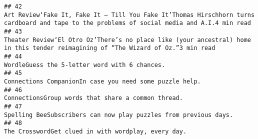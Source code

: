 \documentclass[
]{article}
\begin{document}
\begin{verbatim}
## 42                                                                                                                                                                                                                                                                          Art Review‘Fake It, Fake It — Till You Fake It’Thomas Hirschhorn turns cardboard and tape to the problems of social media and A.I.4 min read
## 43                                                                                                                                                                                                                                                                                     Theater Review‘El Otro Oz’There’s no place like (your ancestral) home in this tender reimagining of “The Wizard of Oz.”3 min read
## 44                                                                                                                                                                                                                                                                                                                                                                         WordleGuess the 5-letter word with 6 chances.
## 45                                                                                                                                                                                                                                                                                                                                                               Connections CompanionIn case you need some puzzle help.
## 46                                                                                                                                                                                                                                                                                                                                                                    ConnectionsGroup words that share a common thread.
## 47                                                                                                                                                                                                                                                                                                                                                      Spelling BeeSubscribers can now play puzzles from previous days.
## 48                                                                                                                                                                                                                                                                                                                                                                   The CrosswordGet clued in with wordplay, every day.

\end{verbatim}
\end{document}
